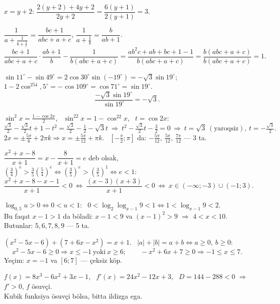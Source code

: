 $x=y+2$: \quad $\dfrac{2(y+2)+4y+2}{2y+2}=\dfrac{6(y+1)}{2(y+1)}=3$.

$\dfrac1{a+\frac1{b+\frac1c}}=\dfrac{bc+1}{abc+a+c}$, \quad $\dfrac1{a+\frac1b}=\dfrac b{ab+1}$.
\[\frac{bc+1}{abc+a+c}\cdot\frac{ab+1}b-\frac1{b(abc+a+c)}=\frac{ab^2c+ab+bc+1-1}{b(abc+a+c)}=\frac{b(abc+a+c)}{b(abc+a+c)}=1.\]

$\sin11^\circ-\sin49^\circ=2\cos30^\circ\sin(-19^\circ)=-\sqrt3\sin19^\circ$;\\
$1-2\cos^254{,}5^\circ=-\cos109^\circ=\cos71^\circ=\sin19^\circ$.
\[\frac{-\sqrt3\sin19^\circ}{\sin19^\circ}=-\sqrt3.\]

$\sin^2x=\frac{1-\cos2x}2$, \ $\sin^22x=1-\cos^22x$, \ $t=\cos2x$:
\[\tfrac{\sqrt3}2-\tfrac{\sqrt3}2t+1-t^2=\tfrac{\sqrt3}2-\tfrac12-\sqrt3t\ \Rightarrow\ t^2-\tfrac{\sqrt3}2t-\tfrac32=0\ \Rightarrow\ t=\sqrt3\ (\text{yaroqsiz}),\ t=-\tfrac{\sqrt3}2.\]
$2x=\pm\frac{5\pi}6+2\pi k\Rightarrow x=\pm\frac{5\pi}{12}+\pi k$. \ $\left[-\frac\pi2;\pi\right]$ da: $-\frac{5\pi}{12},\ \frac{5\pi}{12},\ \frac{7\pi}{12}$ — 3 ta.

$\dfrac{x^2+x-8}{x+1}=x-\dfrac8{x+1}=e$ deb olsak, \ $\left(\frac34\right)^e>\frac35\left(\frac54\right)^e\iff\left(\frac35\right)^e>\left(\frac35\right)^1\iff e<1$:
\[\frac{x^2+x-8-x-1}{x+1}<0\ \iff\ \frac{(x-3)(x+3)}{x+1}<0\ \iff\ x\in(-\infty;-3)\cup(-1;3).\]

$\log_{0{,}5}u>0\iff0<u<1$: \ $0<\log_2\log_{x-1}9<1\iff1<\log_{x-1}9<2$.\\
Bu faqat $x-1>1$ da böladi: $x-1<9$ va $(x-1)^2>9$ $\Rightarrow$ $4<x<10$.\\
Butunlar: $5,6,7,8,9$ — 5 ta.

$(x^2-5x-6)+(7+6x-x^2)=x+1$. \ $|a|+|b|=a+b\iff a\ge0,\ b\ge0$:
\[x^2-5x-6\ge0\Rightarrow x\le-1\ \text{yoki}\ x\ge6;\qquad -x^2+6x+7\ge0\Rightarrow-1\le x\le7.\]
Yeçim: $x=-1$ va $[6;7]$ — çeksiz köp.

$f(x)=8x^3-6x^2+3x-1$, \ $f'(x)=24x^2-12x+3$, \ $D=144-288<0$ $\Rightarrow$ $f'>0$, $f$ ösuvçi.\\
Kubik funksiya ösuvçi bölsa, bitta ildizga ega.

